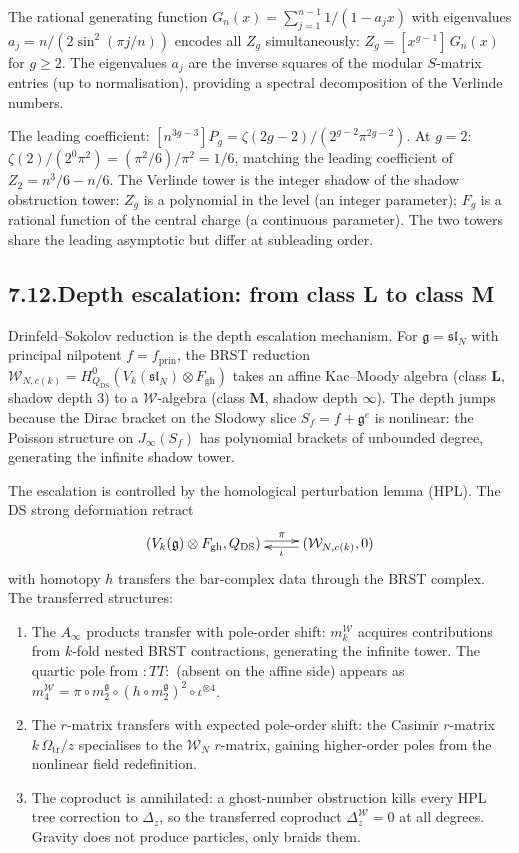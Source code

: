 \documentclass[11pt,reqno]{amsart}
\theoremstyle{definition}
\theoremstyle{remark}
\providecommand{\cW}{\mathcal{W}}
\providecommand{\fg}{\mathfrak{g}}
\providecommand{\DS}{\mathrm{DS}}
\providecommand{\gh}{\mathrm{gh}}
\numberwithin{equation}{section}
\begin{document}
The rational generating function
$G_n(x) = \sum_{j=1}^{n-1} 1/(1 - a_j x)$ with eigenvalues
$a_j = n/(2\sin^2(\pi j/n))$ encodes all $Z_g$ simultaneously:
$Z_g = [x^{g-1}]\,G_n(x)$ for $g \ge 2$. The eigenvalues $a_j$
are the inverse squares of the modular $S$-matrix entries (up to
normalisation), providing a spectral decomposition of the
Verlinde numbers.

The leading coefficient:
$[n^{3g-3}]P_g = \zeta(2g-2)/(2^{g-2}\pi^{2g-2})$. At $g = 2$:
$\zeta(2)/(2^0 \pi^2) = (\pi^2/6)/\pi^2 = 1/6$, matching the
leading coefficient of $Z_2 = n^3/6 - n/6$. The Verlinde tower
is the integer shadow of the shadow obstruction tower: $Z_g$ is
a polynomial in the level (an integer parameter); $F_g$ is a
rational function of the central charge (a continuous parameter).
The two towers share the leading asymptotic but differ at
subleading order.

\subsection*{7.12.\quad Depth escalation: from class L to class M}

Drinfeld--Sokolov reduction is the depth escalation mechanism.
For $\fg = \mathfrak{sl}_N$ with principal nilpotent
$f = f_{\mathrm{prin}}$, the BRST reduction
$\cW_{N,c(k)} = H^0_{Q_{\DS}}(V_k(\mathfrak{sl}_N) \otimes F_{\mathrm{gh}})$
takes an affine Kac--Moody algebra (class $\mathbf{L}$,
shadow depth $3$) to a $\cW$-algebra (class $\mathbf{M}$,
shadow depth $\infty$). The depth jumps because the Dirac
bracket on the Slodowy slice $S_f = f + \fg^e$ is nonlinear:
the Poisson structure on $J_\infty(S_f)$ has polynomial brackets
of unbounded degree, generating the infinite shadow tower.

The escalation is controlled by the homological perturbation
lemma (HPL). The DS strong deformation retract
\[
\xymatrix{
(V_k(\fg) \otimes F_{\gh}, Q_{\DS})
\ar@<0.5ex>[r]^-{\pi} &
(\cW_{N,c(k)}, 0)
\ar@<0.5ex>[l]^-{\iota}
}
\]
with homotopy $h$ transfers the bar-complex data through
the BRST complex. The transferred structures:
\begin{enumerate}[label=(\roman*),nosep]
\item The $A_\infty$ products transfer with pole-order shift:
$m_k^{\cW}$ acquires contributions from $k$-fold nested BRST
contractions, generating the infinite tower. The quartic pole
from $:TT:$ (absent on the affine side) appears as
$m_4^{\cW} = \pi \circ m_2^{\fg} \circ (h \circ m_2^{\fg})^2 \circ \iota^{\otimes 4}$.
\item The $r$-matrix transfers with expected pole-order shift:
the Casimir $r$-matrix $k\,\Omega_{\mathrm{tr}}/z$ specialises to the
$\cW_N$ $r$-matrix, gaining higher-order poles from
the nonlinear field redefinition.
\item The coproduct is annihilated: a ghost-number obstruction
kills every HPL tree correction to $\Delta_z$, so the
transferred coproduct $\Delta_z^{\cW} = 0$ at all degrees.
Gravity does not produce particles, only braids them.
\end{enumerate}
\end{document}
